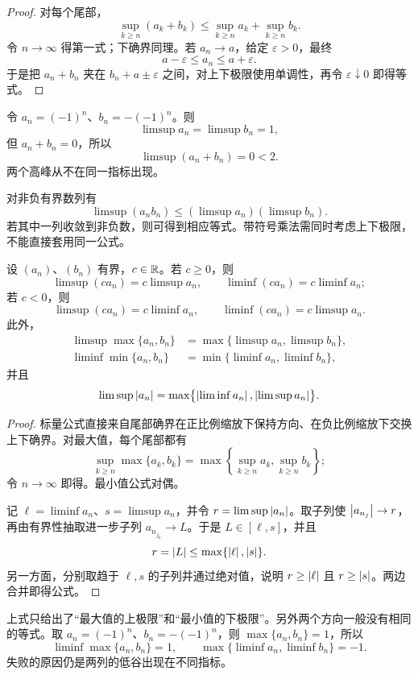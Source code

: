 \begin{proof}
对每个尾部，
\[
 \sup_{k\ge n}(a_k+b_k)
 \le\sup_{k\ge n}a_k+\sup_{k\ge n}b_k.
\]
令 \(n\to\infty\) 得第一式；下确界同理。若 \(a_n\to a\)，给定 \(\varepsilon>0\)，最终
\[
 a-\varepsilon\le a_n\le a+\varepsilon.
\]
于是把 \(a_n+b_n\) 夹在 \(b_n+a\pm\varepsilon\) 之间，对上下极限使用单调性，再令 \(\varepsilon\downarrow0\) 即得等式。
\end{proof}

\begin{counterexample}
令 \(a_n=(-1)^n\)、\(b_n=-(-1)^n\)。则
\[
 \limsup a_n=\limsup b_n=1,
\]
但 \(a_n+b_n=0\)，所以
\[
 \limsup(a_n+b_n)=0<2.
\]
两个高峰从不在同一指标出现。
\end{counterexample}

对非负有界数列有
\[
 \limsup(a_nb_n)\le(\limsup a_n)(\limsup b_n).
\]
若其中一列收敛到非负数，则可得到相应等式。带符号乘法需同时考虑上下极限，不能直接套用同一公式。

\begin{proposition}[标量、最大值与绝对值]
设 \((a_n)\)、\((b_n)\) 有界，\(c\in\mathbb{R}\)。若 \(c\ge0\)，则
\[
 \limsup(ca_n)=c\limsup a_n,\qquad
 \liminf(ca_n)=c\liminf a_n;
\]
若 \(c<0\)，则
\[
 \limsup(ca_n)=c\liminf a_n,\qquad
 \liminf(ca_n)=c\limsup a_n.
\]
此外，
\[
\begin{aligned}
 \limsup\max\{a_n,b_n\}
 &=\max\{\limsup a_n,\limsup b_n\},\\
 \liminf\min\{a_n,b_n\}
 &=\min\{\liminf a_n,\liminf b_n\},
\end{aligned}
\]
并且
\[
 \limsup\left|a_n\right|
 =\max\bigl\{\left|\liminf a_n\right|,\left|\limsup a_n\right|\bigr\}.
\]
\end{proposition}

\begin{proof}
标量公式直接来自尾部确界在正比例缩放下保持方向、在负比例缩放下交换上下确界。对最大值，每个尾部都有
\[
 \sup_{k\ge n}\max\{a_k,b_k\}
 =\max\left\{\sup_{k\ge n}a_k,\sup_{k\ge n}b_k\right\};
\]
令 \(n\to\infty\) 即得。最小值公式对偶。

记 \(\ell=\liminf a_n\)、\(s=\limsup a_n\)，并令
\(r=\limsup\left|a_n\right|\)。取子列使
\(\left|a_{n_j}\right|\to r\)，再由有界性抽取进一步子列
\(a_{n_{j_k}}\to L\)。于是 \(L\in[\ell,s]\)，并且
\[
 r=\left|L\right|\le\max\{\left|\ell\right|,\left|s\right|\}.
\]
另一方面，分别取趋于 \(\ell,s\) 的子列并通过绝对值，说明
\(r\ge\left|\ell\right|\) 且 \(r\ge\left|s\right|\)。两边合并即得公式。
\end{proof}

上式只给出了“最大值的上极限”和“最小值的下极限”。另外两个方向一般没有相同的等式。取
\(a_n=(-1)^n\)、\(b_n=-(-1)^n\)，则
\(\max\{a_n,b_n\}=1\)，所以
\[
 \liminf\max\{a_n,b_n\}=1,
 \qquad
 \max\{\liminf a_n,\liminf b_n\}=-1.
\]
失败的原因仍是两列的低谷出现在不同指标。


